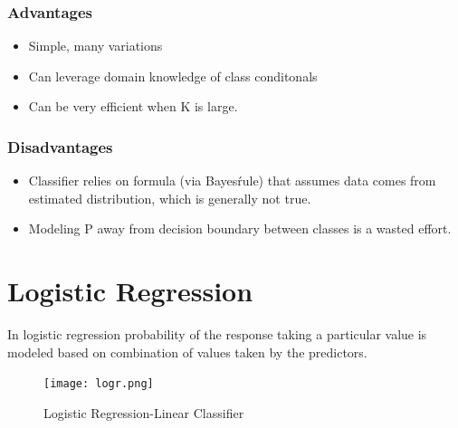 \subsubsection{Advantages}
\begin{itemize}
    \item Simple, many variations
    \item Can leverage domain knowledge of class conditonals
    \item Can be very efficient when K is large.
\end{itemize}

\subsubsection{Disadvantages}
\begin{itemize}
    \item Classifier relies on formula (via Bayes\' rule) that assumes data comes from estimated distribution, which is generally not true.
    \item Modeling P away from decision boundary between classes is a wasted effort.
\end{itemize}

\section{Logistic Regression}
In logistic regression probability of the response taking a particular value is modeled based on combination of values taken by the predictors. 
\begin{figure}[H]
  \begin{center}
    \texttt{[image: logr.png]}
    \caption{
      Logistic Regression-Linear Classifier}
  \end{center}
\end{figure}

